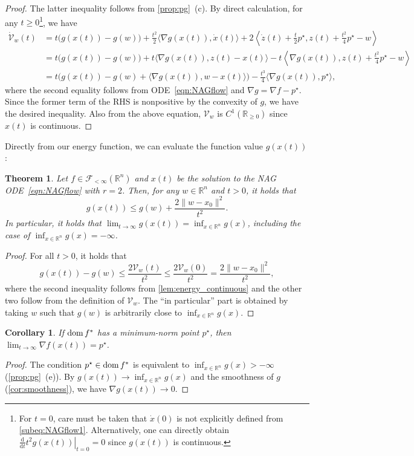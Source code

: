 \documentclass[11pt,a4paper]{article}
\theoremstyle{definition}
\theoremstyle{plain}
\newtheorem{thm}{Theorem}[section]
\newtheorem{cor}[cor]{Corollary}
\newcommand{\RR}{{\mathbb{R}}}
\newcommand{\rmd}{{\mathrm{d}}}
\newcommand{\dom}{\mathop{\rm dom}}
\begin{document}
\begin{proof}
    The latter inequality follows from \cref{prop:pg}~(c).
    By direct calculation, for any $t \ge 0$\footnote{For $t = 0$, care must be taken that $\dot x(0)$ is not explicitly defined from \eqref{subeq:NAGflow1}. Alternatively, one can directly obtain $\left.\frac{\rmd}{\rmd t}t^2g(x(t))\right|_{t = 0} = 0$ since $g(x(t))$ is continuous.}, we have
    \begin{align*}
        \dot{\mathcal{V}}_w(t)
        &= t\bigl(g(x(t)) - g(w)\bigr) + \frac{t^2}2\langle\nabla g(x(t)), \dot x(t)\rangle + 2\left\langle\dot z(t) + \frac{t}2p^\star, z(t) + \frac{t^2}4p^\star - w\right\rangle\\
        &= t\bigl(g(x(t)) - g(w)\bigr) + t\langle\nabla g(x(t)), z(t) - x(t)\rangle - t\left\langle\nabla g(x(t)), z(t) + \frac{t^2}4p^\star - w\right\rangle\\
        &= t\bigl(g(x(t)) - g(w) + \langle\nabla g(x(t)), w - x(t)\rangle\bigr) - \frac{t^3}4\langle\nabla g(x(t)), p^\star\rangle,
    \end{align*}
    where the second equality follows from ODE~\eqref{eqn:NAGflow} and $\nabla g = \nabla f - p^\star$.
    Since the former term of the RHS is nonpositive by the convexity of $g$, we have the desired inequality.
    Also from the above equation, $\mathcal{V}_w$ is $C^1(\RR_{\ge 0})$ since $x(t)$ is continuous.
\end{proof}

Directly from our energy function, we can evaluate the function value $g(x(t))$:
\begin{thm}\label{prop:NAG_value_continuous}
    Let $f \in \mathcal{F}_{< \infty}(\RR^n)$ and $x(t)$ be the solution to the NAG ODE~\eqref{eqn:NAGflow} with $r = 2$.
    Then, for any $w \in \RR^n$ and $t > 0$, it holds that
    \[
        g(x(t)) \le g(w) + \frac{2\|w - x_0\|^2}{t^2}.
    \]
    In particular, it holds that $\lim_{t \to \infty}g(x(t)) = \inf_{x \in \RR^n} g(x)$, including the case of $\inf_{x \in \RR^n} g(x) = -\infty$.
\end{thm}
\begin{proof}
    For all $t > 0$, it holds that
    \[
        g(x(t)) - g(w) \le \frac{2\mathcal{V}_w(t)}{t^2} \le \frac{2\mathcal{V}_w(0)}{t^2} = \frac{2\|w - x_0\|^2}{t^2},
    \]
    where the second inequality follows from \cref{lem:energy_continuous} and the other two follow from the definition of $\mathcal{V}_w$.
    The ``in particular'' part is obtained by taking $w$ such that $g(w)$ is arbitrarily close to $\inf_{x \in \RR^n}g(x)$.
\end{proof}
\begin{cor}
    If $\dom f^\ast$ has a minimum-norm point $p^\star$, then $\lim_{t \to \infty}\nabla f(x(t)) = p^\star$.
\end{cor}
\begin{proof}
    The condition $p^\star \in \dom f^\ast$ is equivalent to $\inf_{x \in \RR^n}g(x) > -\infty$ (\cref{prop:pg}~(e)).
    By $g(x(t)) \to \inf_{x \in \RR^n} g(x)$ and the smoothness of $g$ (\cref{cor:smoothness}), we have $\nabla g(x(t)) \to 0$.
\end{proof}
\end{document}
